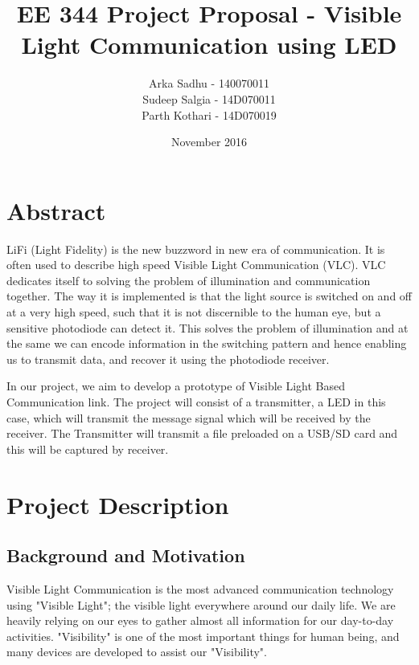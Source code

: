 \documentclass{article}
\title{EE 344 Project Proposal - Visible Light Communication using LED}
\author{
Arka Sadhu - 140070011\\
Sudeep Salgia - 14D070011\\
Parth Kothari - 14D070019\\
}
\date{November 2016}
\begin{document}
\maketitle

\tableofcontents
\newpage
\section{Abstract}
LiFi (Light Fidelity) is the new buzzword in new era of communication. It is often used to describe high speed Visible Light Communication (VLC). VLC dedicates itself to solving the problem of illumination and communication together. The way it is implemented is that the light source is switched on and off at a very high speed, such that it is not discernible to the human eye, but a sensitive photodiode can detect it. This solves the problem of illumination and at the same we can encode information in the switching pattern and hence enabling us to transmit data, and recover it using the photodiode receiver.

In our project, we aim to develop a prototype of Visible Light Based Communication link. The project will consist of a transmitter, a LED in this case, which will transmit the message signal which will be received by the receiver. The Transmitter will transmit a file preloaded on a USB/SD card and this will be captured by receiver. 

\section{Project Description}
\subsection{Background and Motivation}
Visible Light Communication is the most advanced communication technology using "Visible Light"; the visible light everywhere around our daily life. We are heavily relying on our eyes to gather almost all information for our day-to-day activities. "Visibility" is one of the most important things for human being, and many devices are developed to assist our "Visibility". 
\end{document}
